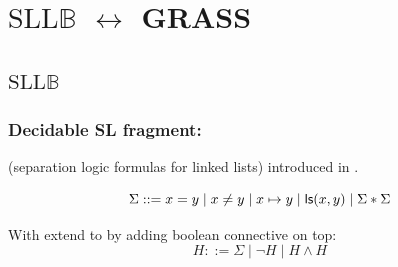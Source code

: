 \documentclass{beamer}
\begin{document}
\section{$\text{SLL}\mathbb{B}$ $\leftrightarrow$ GRASS}

\subsection{$\text{SLL}\mathbb{B}$}

\begin{frame}
  \frametitle{Decidable SL fragment: \JoshLogic}

\JoshLogicSimple (separation logic formulas for linked lists) introduced in \cite{BerdineETAL04DecidableFragmentSeparationLogic}.

\vspace{2ex}

\JoshLogicSimple
\begin{equation*}
  \Sigma ::= x = y \mid x \neq y \mid x \mapsto y \mid \mathsf{ls}({x},{y}) \mid \Sigma * \Sigma
\end{equation*}

\vspace{2ex}

With extend \JoshLogicSimple to \JoshLogic by adding boolean connective on top:
\begin{equation*}
  H ::= \Sigma \mid \neg H \mid H \land H
\end{equation*}

\end{frame}

\end{document}
